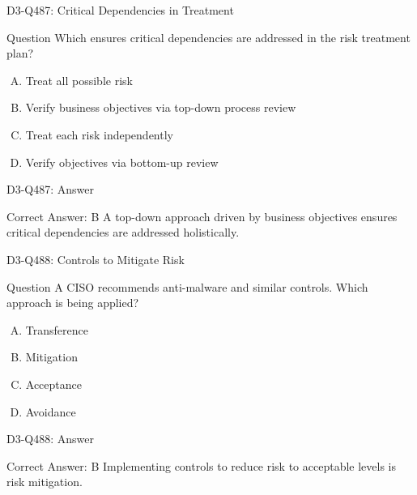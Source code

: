 \documentclass{beamer}
\begin{document}
\begin{frame}{D3-Q487: Critical Dependencies in Treatment}
	\begin{block}{Question}
		Which ensures critical dependencies are addressed in the risk treatment plan?
	\end{block}
	\begin{enumerate}[(A)]
		\item Treat all possible risk
		\item Verify business objectives via top-down process review
		\item Treat each risk independently
		\item Verify objectives via bottom-up review
	\end{enumerate}
\end{frame}
\begin{frame}{D3-Q487: Answer}
	\begin{block}{Correct Answer: B}
		A top-down approach driven by business objectives ensures critical dependencies are addressed holistically.
	\end{block}
\end{frame}

\begin{frame}{D3-Q488: Controls to Mitigate Risk}
	\begin{block}{Question}
		A CISO recommends anti-malware and similar controls. Which approach is being applied?
	\end{block}
	\begin{enumerate}[(A)]
		\item Transference
		\item Mitigation
		\item Acceptance
		\item Avoidance
	\end{enumerate}
\end{frame}
\begin{frame}{D3-Q488: Answer}
	\begin{block}{Correct Answer: B}
		Implementing controls to reduce risk to acceptable levels is risk mitigation.
	\end{block}
\end{frame}
\end{document}

